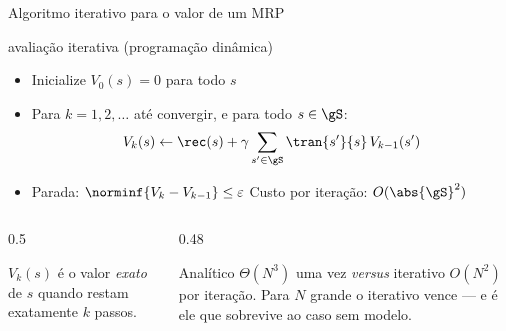 \documentclass[aspectratio=169, 11pt]{beamer}
\begin{document}
\begin{frame}{Algoritmo iterativo para o valor de um MRP}
  \begin{algbox}{avaliação iterativa (programação dinâmica)}
    \begin{itemize}\setlength{\itemsep}{0.2ex}
      \item Inicialize $V_0(s) = 0$ para todo $s$
      \item Para $k = 1, 2, \dots$ até convergir, e para todo $s \in \gS$:
        \[ V_k(s) \leftarrow \rec(s) + \gamma \sum_{s' \in \gS} \tran{s'}{s}\, V_{k-1}(s') \]
      \item Parada: $\norminf{V_k - V_{k-1}} \le \varepsilon$ \quad
            {\small Custo por iteração: $O(\abs{\gS}^2)$}
    \end{itemize}
  \end{algbox}
  \vspace{-0.9em}
  \begin{columns}[T]
    \begin{column}{0.5\textwidth}
      \begin{ideiabox}
        $V_k(s)$ é o valor \emph{exato} de $s$ quando restam exatamente $k$ passos.
      \end{ideiabox}
    \end{column}
    \begin{column}{0.48\textwidth}
      \begin{alertabox}
        Analítico $\Theta(N^3)$ uma vez \emph{versus} iterativo $O(N^2)$ por iteração.
        Para $N$ grande o iterativo vence --- e é ele que sobrevive ao caso sem modelo.
      \end{alertabox}
    \end{column}
  \end{columns}
\end{frame}
\end{document}
